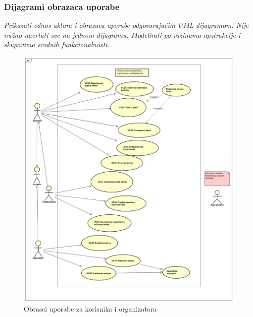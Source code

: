 				\subsubsection{Dijagrami obrazaca uporabe}
				
				
				
					
					\textit{Prikazati odnos aktora i obrazaca uporabe odgovarajućim UML dijagramom. Nije nužno nacrtati sve na jednom dijagramu. Modelirati po razinama apstrakcije i skupovima srodnih funkcionalnosti.}
				\eject				
				
				
				\begin{figure}[H]
				\begin{center}
					\includegraphics[width=17cm]{slike/glazbenik_organizator.PNG}
				\end{center}
				\caption{Obrasci uporabe za korisnika i organizatora}
				\label{fig:ou1}
			\end{figure}
		
